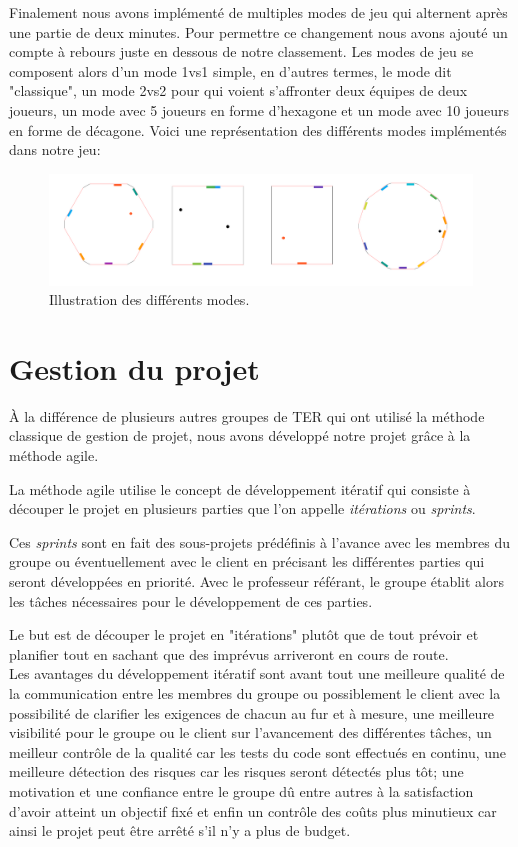 Finalement nous avons implémenté de multiples modes de jeu qui alternent après une partie de deux minutes. Pour permettre ce changement nous avons ajouté un compte à rebours juste en dessous de notre classement. Les modes de jeu se composent alors d'un mode 1vs1 simple, en d'autres termes, le mode dit "classique", un mode 2vs2 pour qui voient s'affronter deux équipes de deux joueurs, un mode avec 5 joueurs en forme d'hexagone et un mode avec 10 joueurs en forme de décagone. Voici une représentation des différents modes implémentés dans notre jeu:

\begin{figure}[!h]
  \centering
  \includegraphics[width=15cm]{images/Capture11}
  \caption{Illustration des différents modes.}
  \label{fig:quatre-image}
\end{figure}


\section{Gestion du projet}

À la différence de plusieurs autres groupes de TER qui ont utilisé la méthode classique de gestion de projet, nous avons développé notre projet grâce à la méthode agile.


La méthode agile utilise le concept de développement itératif qui consiste à découper le projet en plusieurs parties que l’on appelle \emph{itérations} ou \emph{sprints}.


Ces \emph{sprints} sont en fait des sous-projets prédéfinis à l'avance avec les membres du groupe ou éventuellement avec le client en précisant les différentes parties qui seront développées en priorité. Avec le professeur référant, le groupe établit alors les tâches nécessaires pour le développement de ces parties.


Le but est de découper le projet en "itérations" plutôt que de tout prévoir et planifier tout en sachant que des imprévus arriveront en cours de route.\\
Les avantages du développement itératif sont avant tout une meilleure qualité de la communication entre les membres du groupe ou possiblement le client avec la possibilité de clarifier les exigences de chacun au fur et à mesure, une meilleure visibilité pour le groupe ou le client sur l’avancement des différentes tâches, un meilleur contrôle de la qualité car les tests du code sont effectués en continu, une meilleure détection des risques car les risques seront détectés plus tôt; une motivation et une confiance entre le groupe dû entre autres à la satisfaction d’avoir atteint un objectif fixé et enfin un contrôle des coûts plus minutieux car ainsi le projet peut être arrêté s’il n’y a plus de budget.


